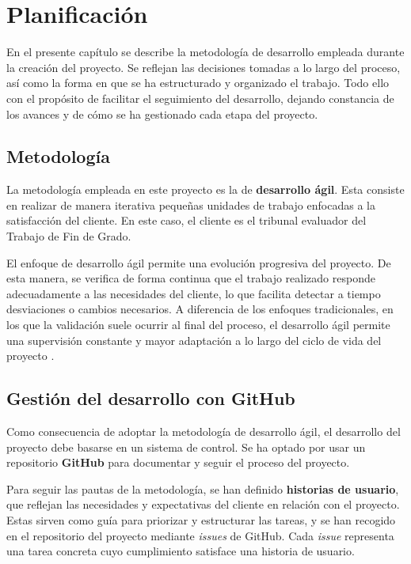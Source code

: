 \chapter{Planificación}

En el presente capítulo se describe la metodología de desarrollo empleada durante la creación del proyecto. Se reflejan las decisiones tomadas a lo largo del proceso, así como la forma en que se ha estructurado y organizado el trabajo. Todo ello con el propósito de facilitar el seguimiento del desarrollo, dejando constancia de los avances y de cómo se ha gestionado cada etapa del proyecto.
\section{Metodología}

La metodología empleada en este proyecto es la de \textbf{desarrollo ágil}. Esta consiste en realizar de manera iterativa pequeñas unidades de trabajo enfocadas a la satisfacción del cliente. En este caso, el cliente es el tribunal evaluador del Trabajo de Fin de Grado.

El enfoque de desarrollo ágil permite una evolución progresiva del proyecto. De esta manera, se verifica de forma continua que el trabajo realizado responde adecuadamente a las necesidades del cliente, lo que facilita detectar a tiempo desviaciones o cambios necesarios. A diferencia de los enfoques tradicionales, en los que la validación suele ocurrir al final del proceso, el desarrollo ágil permite una supervisión constante y mayor adaptación a lo largo del ciclo de vida del proyecto \cite{AgileAlliance2024}.

\section{Gestión del desarrollo con GitHub}

Como consecuencia de adoptar la metodología de desarrollo ágil, el desarrollo del proyecto debe basarse en un sistema de control. Se ha optado por usar un repositorio \textbf{GitHub} para documentar y seguir el proceso del proyecto. 

Para seguir las pautas de la metodología, se han definido \textbf{historias de usuario}, que reflejan las necesidades y expectativas del cliente en relación con el proyecto. Estas sirven como guía para priorizar y estructurar las tareas, y se han recogido en el repositorio del proyecto mediante \textit{issues} de GitHub. Cada \textit{issue} representa una tarea concreta cuyo cumplimiento satisface una historia de usuario.

